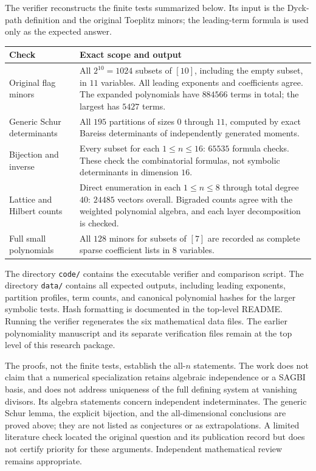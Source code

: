 \documentclass[11pt]{article}
\theoremstyle{definition}
\theoremstyle{remark}
\begin{document}
The verifier reconstructs the finite tests summarized below.
Its input is the Dyck-path definition and the original Toeplitz minors;
the leading-term formula is used only as the expected answer.
\begin{center}
\begin{tabular}{p{}p{}}
\toprule
Check & Exact scope and output\\
\midrule
Original flag minors & All $2^{10}=1024$ subsets of $[10]$, including the
empty subset, in $11$ variables. All leading exponents and coefficients
agree. The expanded polynomials have $884566$ terms in total; the largest
has $5427$ terms.\\[3pt]
Generic Schur determinants & All $195$ partitions of sizes $0$ through $11$,
computed by exact Bareiss determinants of independently generated moments.\\[3pt]
Bijection and inverse & Every subset for each $1\le n\le16$: $65535$ formula
checks. These check the combinatorial formulas, not symbolic determinants
in dimension $16$.\\[3pt]
Lattice and Hilbert counts & Direct enumeration in each $1\le n\le8$ through
total degree $40$: $24485$ vectors overall. Bigraded counts agree with the
weighted polynomial algebra, and each layer decomposition is checked.\\[3pt]
Full small polynomials & All $128$ minors for subsets of $[7]$ are recorded
as complete sparse coefficient lists in $8$ variables.\\
\bottomrule
\end{tabular}
\end{center}

The directory \texttt{code/} contains the executable verifier and comparison
script. The directory \texttt{data/} contains all expected outputs, including
leading exponents, partition profiles, term counts, and canonical polynomial
hashes for the larger symbolic tests. Hash formatting is documented in the
top-level README. Running the verifier regenerates the six mathematical
data files. The earlier polynomiality manuscript and its separate
verification files remain at the top level of this research package.

The proofs, not the finite tests, establish the all-$n$ statements.
The work does not claim that a numerical specialization retains algebraic
independence or a SAGBI basis, and does not address uniqueness of the full
defining system at vanishing divisors. Its algebra statements concern
independent indeterminates. The generic Schur lemma, the explicit bijection,
and the all-dimensional conclusions are proved above; they are not listed
as conjectures or as extrapolations. A limited literature check located the
original question and its publication record but does not certify priority
for these arguments. Independent mathematical review remains appropriate.
\end{document}
